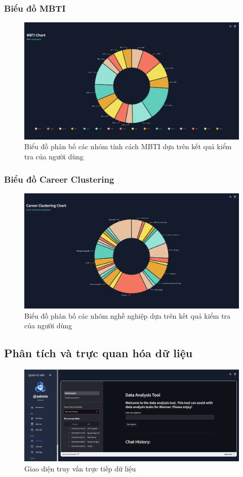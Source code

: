 \subsubsection{Biểu đồ MBTI}
\begin{figure}[H]
    \centering
    \includegraphics[width=0.75\linewidth]{mbtiChart.png}
    \vspace{0.6cm}
    \caption{Biểu đồ phân bố các nhóm tính cách MBTI dựa trên kết quả kiểm tra của người dùng}
\end{figure}

\subsubsection{Biểu đồ Career Clustering}
\begin{figure}[H]
    \centering
    \includegraphics[width=0.75\linewidth]{images/CCChart.png}
    \vspace{0.6cm}
    \caption{Biểu đồ phân bố các nhóm nghề nghiệp dựa trên kết quả kiểm tra của người dùng}
\end{figure}

\subsection{Phân tích và trực quan hóa dữ liệu}
\label{sec:data_analysis}
\begin{figure}[H]
    \centering
    \includegraphics[width=0.75\linewidth]{images/admin.jpg}
    \vspace{0.6cm}
    \caption{Giao diện truy vấn trực tiếp dữ liệu}
\end{figure}

